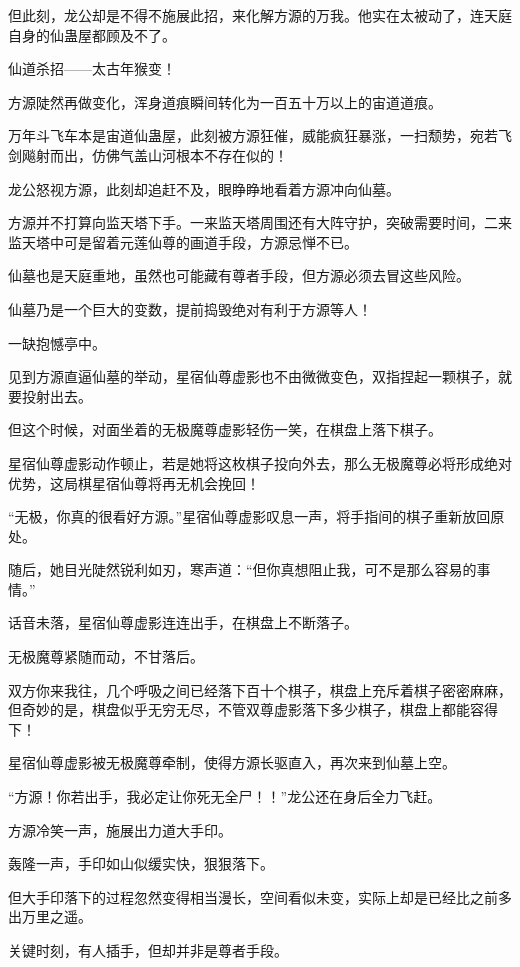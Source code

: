 \begin{this_body}
但此刻，龙公却是不得不施展此招，来化解方源的万我。他实在太被动了，连天庭自身的仙蛊屋都顾及不了。

仙道杀招——太古年猴变！

方源陡然再做变化，浑身道痕瞬间转化为一百五十万以上的宙道道痕。

万年斗飞车本是宙道仙蛊屋，此刻被方源狂催，威能疯狂暴涨，一扫颓势，宛若飞剑飚射而出，仿佛气盖山河根本不存在似的！

龙公怒视方源，此刻却追赶不及，眼睁睁地看着方源冲向仙墓。

方源并不打算向监天塔下手。一来监天塔周围还有大阵守护，突破需要时间，二来监天塔中可是留着元莲仙尊的画道手段，方源忌惮不已。

仙墓也是天庭重地，虽然也可能藏有尊者手段，但方源必须去冒这些风险。

仙墓乃是一个巨大的变数，提前捣毁绝对有利于方源等人！

一缺抱憾亭中。

见到方源直逼仙墓的举动，星宿仙尊虚影也不由微微变色，双指捏起一颗棋子，就要投射出去。

但这个时候，对面坐着的无极魔尊虚影轻伤一笑，在棋盘上落下棋子。

星宿仙尊虚影动作顿止，若是她将这枚棋子投向外去，那么无极魔尊必将形成绝对优势，这局棋星宿仙尊将再无机会挽回！

“无极，你真的很看好方源。”星宿仙尊虚影叹息一声，将手指间的棋子重新放回原处。

随后，她目光陡然锐利如刃，寒声道：“但你真想阻止我，可不是那么容易的事情。”

话音未落，星宿仙尊虚影连连出手，在棋盘上不断落子。

无极魔尊紧随而动，不甘落后。

双方你来我往，几个呼吸之间已经落下百十个棋子，棋盘上充斥着棋子密密麻麻，但奇妙的是，棋盘似乎无穷无尽，不管双尊虚影落下多少棋子，棋盘上都能容得下！

星宿仙尊虚影被无极魔尊牵制，使得方源长驱直入，再次来到仙墓上空。

“方源！你若出手，我必定让你死无全尸！！”龙公还在身后全力飞赶。

方源冷笑一声，施展出力道大手印。

轰隆一声，手印如山似缓实快，狠狠落下。

但大手印落下的过程忽然变得相当漫长，空间看似未变，实际上却是已经比之前多出万里之遥。

关键时刻，有人插手，但却并非是尊者手段。


\end{this_body}
